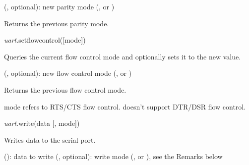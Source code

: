\documentclass[a4paper,12pt,twoside,extrafontsizes]{memoir}
\begin{document}
\begin{funcparams}
	 (, optional): new parity mode (,  or )
\end{funcparams}

\begin{funcret}
	Returns the previous parity mode.
\end{funcret}


\begin{luafuncprototype}
\emph{uart}.setflowcontrol([mode])
\end{luafuncprototype}

\begin{funcdescr}
	Queries the current flow control mode and optionally sets it to the new value.
\end{funcdescr}

\begin{funcparams}
	 (, optional): new flow control mode (,  or )
\end{funcparams}

\begin{funcret}
	Returns the previous flow control mode.
\end{funcret}

\begin{funcremarks}
	 mode refers to RTS/CTS flow control.  doesn't support DTR/DSR flow control.
\end{funcremarks}


\begin{luafuncprototype}
\emph{uart}.write(data [, mode])
\end{luafuncprototype}

\begin{funcdescr}
	Writes data to the serial port.
\end{funcdescr}

\begin{funcparams}
	 (): data to write
	 (, optional): write mode (,  or ), see the Remarks below
\end{funcparams}
\end{document}
